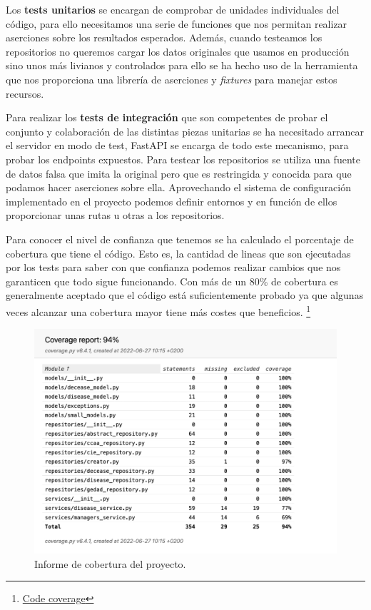 Los \textbf{tests unitarios} se encargan de comprobar de unidades individuales del código,
para ello necesitamos una serie de funciones que nos permitan realizar aserciones sobre
los resultados esperados. Además, cuando testeamos los repositorios no queremos cargar los
datos originales que usamos en producción sino unos más livianos y controlados para ello
se ha hecho uso de la herramienta  que nos proporciona una librería de
aserciones y \textit{fixtures} para manejar estos recursos.

Para realizar los \textbf{tests de integración} que son competentes de probar el conjunto
y colaboración de las distintas piezas unitarias se ha necesitado arrancar el servidor en
modo de test, FastAPI se encarga de todo este mecanismo, para probar los endpoints
expuestos. Para testear los repositorios se utiliza una fuente de datos falsa que imita la
original pero que es restringida y conocida para que podamos hacer aserciones sobre ella.
Aprovechando el sistema de configuración implementado en el proyecto podemos definir
entornos y en función de ellos proporcionar unas rutas u otras a los repositorios.

Para conocer el nivel de confianza que tenemos se ha calculado el porcentaje de cobertura
que tiene el código. Esto es, la cantidad de lineas que son ejecutadas por los tests para
saber con que confianza podemos realizar cambios que nos garanticen que todo sigue
funcionando. Con más de un 80\% de cobertura es generalmente aceptado que el código está
suficientemente probado ya que algunas veces alcanzar una cobertura mayor tiene más costes
que beneficios.
\footnote{\href{https://www.atlassian.com/continuous-delivery/software-testing/code-coverage}{Code
coverage}}

\FloatBarrier
\begin{figure}[h]
	\centering	
	\includegraphics[width=\textwidth]{doc/logos/imgs/cobertura.jpg}
    \caption{ Informe de cobertura del proyecto.}
    \label{fig:cobertura-tests}
\end{figure}
\FloatBarrier

